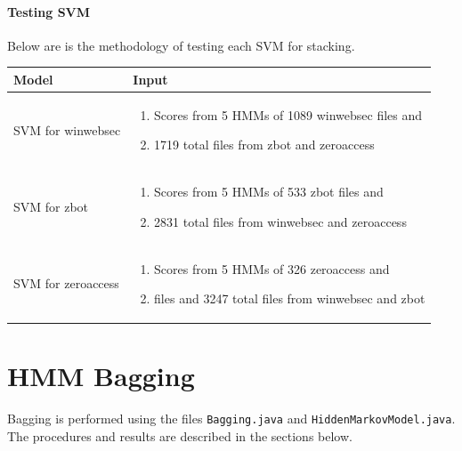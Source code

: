 \documentclass[12pt]{article}
\begin{document}
\paragraph{Testing SVM}
Below are is the methodology of testing each SVM for stacking.
  \begin{table}[H]
    \centering
    \begin{tabular}{|l|p{}|}
    \hline \textbf{Model} & \textbf{Input} \\\hline \hline
    SVM for winwebsec   & 
        \begin{enumerate}
          \item Scores from 5 HMMs of 1089 winwebsec files and 
          \item 1719 total files from zbot and zeroaccess  
        \end{enumerate}  \\\hline
     SVM for zbot   & 
        \begin{enumerate}
          \item Scores from 5 HMMs of 533 zbot files and 
          \item 2831 total files from winwebsec and zeroaccess 
    \end{enumerate} \\\hline
     SVM for zeroaccess
     & 
        \begin{enumerate}
    \item Scores from 5 HMMs of 326 zeroaccess and
    \item files and 3247 total files from winwebsec and zbot          
  \end{enumerate}
  \\\hline
  \end{tabular}
  \end{table}  



\section{HMM Bagging}
  Bagging is performed using the files \texttt{Bagging.java} and \texttt{HiddenMarkovModel.java}. The procedures and results are described in the sections below.
\end{document}
